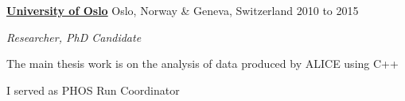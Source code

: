 \documentclass[11pt]{article}
\newenvironment{outerlist}[1][\enskip\textbullet]%
        {\begin{itemize}[#1]}{\end{itemize}%
         \vspace{-.6\baselineskip}}
\newenvironment{innerlist}[1][\enskip\textbullet]%
        {\begin{compactitem}[#1]}{\end{compactitem}}
\newcommand{\blankline}{\quad\pagebreak[2]}
\begin{document}
\href{http://www.uib.no/en}{\textbf{University of Oslo}}
Oslo, Norway \& Geneva, Switzerland
\hfill 2010 to 2015
\begin{outerlist}
\item[] \textit{Researcher, PhD Candidate}
  \begin{innerlist}
    \footnotesize
  \item The main thesis work is on the analysis of data produced by ALICE using C++
  \item I served as PHOS Run Coordinator
  \end{innerlist}
\end{outerlist}

\blankline
\end{document}
